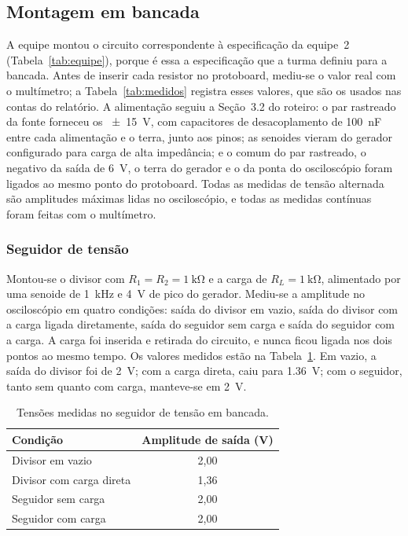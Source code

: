 \documentclass[11pt,a4paper]{article}
\begin{document}
\clearpage

\subsection{Montagem em bancada}

A equipe montou o circuito correspondente à especificação da equipe~2 (Tabela~\ref{tab:equipe}), porque é essa a especificação que a turma definiu para a bancada. Antes de inserir cada resistor no protoboard, mediu-se o valor real com o multímetro; a Tabela~\ref{tab:medidos} registra esses valores, que são os usados nas contas do relatório. A alimentação seguiu a Seção~3.2 do roteiro: o par rastreado da fonte forneceu os \SI{\pm 15}{\volt}, com capacitores de desacoplamento de \SI{100}{\nano\farad} entre cada alimentação e o terra, junto aos pinos; as senoides vieram do gerador configurado para carga de alta impedância; e o comum do par rastreado, o negativo da saída de \SI{6}{\volt}, o terra do gerador e o da ponta do osciloscópio foram ligados ao mesmo ponto do protoboard. Todas as medidas de tensão alternada são amplitudes máximas lidas no osciloscópio, e todas as medidas contínuas foram feitas com o multímetro.

\subsubsection{Seguidor de tensão}

Montou-se o divisor com $R_1 = R_2 = \SI{1}{\kilo\ohm}$ e a carga de $R_L = \SI{1}{\kilo\ohm}$, alimentado por uma senoide de \SI{1}{\kilo\hertz} e \SI{4}{\volt} de pico do gerador. Mediu-se a amplitude no osciloscópio em quatro condições: saída do divisor em vazio, saída do divisor com a carga ligada diretamente, saída do seguidor sem carga e saída do seguidor com a carga. A carga foi inserida e retirada do circuito, e nunca ficou ligada nos dois pontos ao mesmo tempo. Os valores medidos estão na Tabela~\ref{tab:seguidor_bancada}. Em vazio, a saída do divisor foi de \SI{2}{\volt}; com a carga direta, caiu para \SI{1,36}{\volt}; com o seguidor, tanto sem quanto com carga, manteve-se em \SI{2}{\volt}.

\begin{table}[h]
\centering
\caption{Tensões medidas no seguidor de tensão em bancada.}
\label{tab:seguidor_bancada}
\begin{tabular}{lc}
\hline
Condição & Amplitude de saída (\si{\volt}) \\
\hline
Divisor em vazio & 2,00 \\
Divisor com carga direta & 1,36 \\
Seguidor sem carga & 2,00 \\
Seguidor com carga & 2,00 \\
\hline
\end{tabular}
\end{table}
\end{document}
